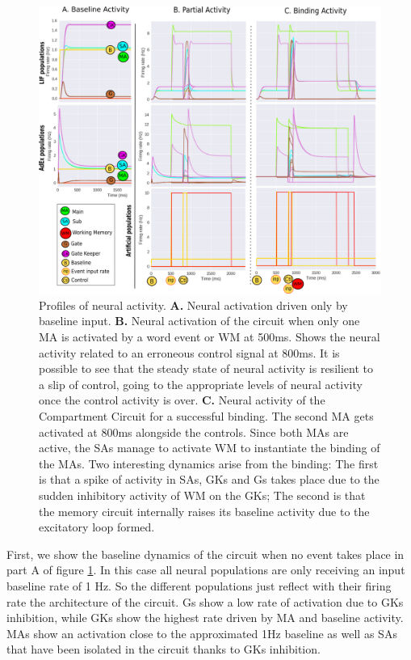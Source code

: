 \documentclass[10pt]{article}
\begin{document}
\begin{figure}[h!]
  \begin{center}
    \includegraphics[width=1.0\columnwidth]{figures/compartment_circuit_dynamics}
    \caption{Profiles of neural activity.
      \textbf{A.} Neural activation driven only by baseline input. \textbf{B.} Neural activation of the circuit when only one MA is activated by a word event or WM at 500ms.
      Shows the neural activity related to an erroneous control signal at 800ms.
      It is possible to see that the steady state of neural activity is resilient to a slip of control, going to the appropriate levels of neural activity once the control activity is over.
      \textbf{C.} Neural activity of the Compartment Circuit for a successful binding.
      The second MA gets activated at 800ms alongside the controls.
      Since both MAs are active, the SAs manage to activate WM to instantiate the binding of the MAs.
      Two interesting dynamics arise from the binding:
      The first is that a spike of activity in SAs, GKs and Gs takes place due to the sudden inhibitory activity of WM on the GKs;
      The second is that the memory circuit internally raises its baseline activity due to the excitatory loop formed.
    }

      \label{fig:activity_profiles}
  \end{center}
\end{figure}


First, we show the baseline dynamics of the circuit when no event takes place in part A of figure \ref{fig:activity_profiles}.
In this case all neural populations are only receiving an input baseline rate of 1 Hz.
So the different populations just reflect with their firing rate the architecture of the circuit.
Gs show a low rate of activation due to GKs inhibition, while GKs show the highest rate driven by MA and baseline activity.
MAs show an activation close to the approximated 1Hz baseline as well as SAs that have been isolated in the circuit thanks to GKs inhibition.
\end{document}
